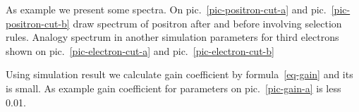 \documentclass{webofc}
\begin{document}
    As example we present some spectra. On pic.~\ref{pic-positron-cut-a} and pic.~\ref{pic-positron-cut-b} draw spectrum of positron after and before involving selection rules. Analogy spectrum in another simulation parameters for third electrons shown on pic.~\ref{pic-electron-cut-a} and pic.~\ref{pic-electron-cut-b}
    
    Using simulation result we calculate gain coefficient by formula~\ref{eq-gain} and its is small. As example gain coefficient for parameters on pic.~\ref{pic-gain-a} is less 0.01.
    
    
    
\end{document}
